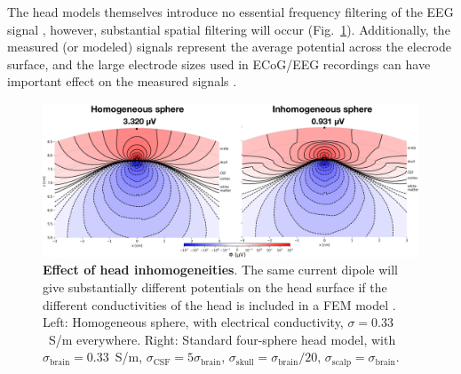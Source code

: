 \documentclass[preprint,11pt,authoryear]{elsarticle}
\newcommand{\hlj}[2][OliveGreen]{ {\sethlcolor{#1} \hl{#2}} }
\newcommand{\hlp}[2][Purple]{ {\sethlcolor{#1} \hl{#2}} }
\newcommand{\tvnnote}[1]{\color{white}{\hlj{TVN: #1 }}\color{black}}
\newcommand{\snnote}[1]{\color{white}{\hlp{SN: #1 }}\color{black}}
\begin{document}
The head models themselves introduce no essential frequency filtering of the EEG signal \citep{Pfurtscheller1975, Nunez2006, Ranta2017}, however, substantial spatial filtering will occur (Fig.~\ref{fig:foursphere_contour}). Additionally, the measured (or modeled) signals represent the average potential across the elecrode surface, and the large electrode sizes used in ECoG/EEG recordings can have important effect on the measured signals \citep{Nunez2006, Hagen2018, Dubey2019}.
%
%

\begin{figure}[!ht]
\begin{center}
\includegraphics[width=1.0\textwidth]{4o_contour}
\end{center}
\caption{\textbf{Effect of head inhomogeneities}.
The same current dipole will give substantially different potentials on the head surface if the different conductivities of the head is included in a FEM model  \citep{Naess2017}. Left: Homogeneous sphere, with electrical conductivity, $\sigma=0.33$~S/m everywhere. Right: Standard four-sphere head model, with $\sigma_{\text{brain}}=0.33$~S/m, $\sigma_{\text{CSF}}=5\sigma_{\text{brain}}$, 
$\sigma_{\text{skull}}=\sigma_{\text{brain}} / 20$, $\sigma_{\text{scalp}}=\sigma_{\text{brain}}$.
}
\label{fig:foursphere_contour}
\end{figure}
\end{document}
